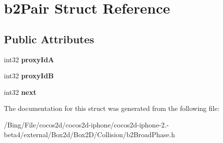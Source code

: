 \hypertarget{structb2_pair}{\section{b2\-Pair Struct Reference}
\label{structb2_pair}
}
\subsection*{Public Attributes}
\begin{DoxyCompactItemize}
\item 
\hypertarget{structb2_pair_abae3df5e877cf0c4611334e3eec4b84c}{int32 {\bfseries proxy\-Id\-A}}\label{structb2_pair_abae3df5e877cf0c4611334e3eec4b84c}

\item 
\hypertarget{structb2_pair_af2bd888ccb34535ab9126497349da749}{int32 {\bfseries proxy\-Id\-B}}\label{structb2_pair_af2bd888ccb34535ab9126497349da749}

\item 
\hypertarget{structb2_pair_a41bcc6aae5e81c8a7bd874e406446ea8}{int32 {\bfseries next}}\label{structb2_pair_a41bcc6aae5e81c8a7bd874e406446ea8}

\end{DoxyCompactItemize}


The documentation for this struct was generated from the following file\-:\begin{DoxyCompactItemize}
\item 
/\-Bing/\-File/cocos2d/cocos2d-\/iphone/cocos2d-\/iphone-\/2.-\/beta4/external/\-Box2d/\-Box2\-D/\-Collision/b2\-Broad\-Phase.\-h\end{DoxyCompactItemize}
